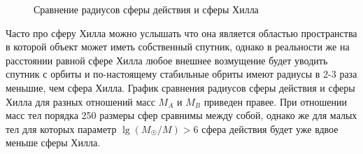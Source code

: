 \begin{wrapfigure}[13]{r}{0.4\tw}
    \centering
    \vspace{-1pc}
    \caption{Сравнение радиусов сферы действия и сферы Хилла}
    \label{pic:hill-influence-sphere-plot}
\end{wrapfigure} 
Часто про сферу Хилла можно услышать что она является областью пространства в которой объект может иметь собственный спутник, однако в реальности же на расстоянии равной сфере Хилла любое внешнее возмущение будет уводить спутник с орбиты и по-настоящему стабильные обриты имеют радиусы в 2-3 раза меньшие, чем сфера Хилла.
 График сравнения радиусов сферы действия и сферы Хилла для разных отношений масс $M_A$ и $M_B$ приведен правее. При отношении масс тел порядка 250 размеры сфер сравнимы между собой, однако же для малых тел для которых параметр $\lg(M_{\astrosun} / M)>6$ сфера действия будет уже вдвое меньше сферы Хилла. 
